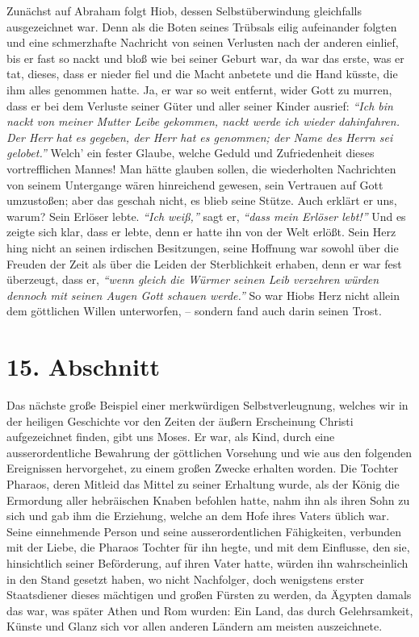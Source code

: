 Zunächst auf Abraham folgt Hiob, dessen
Selbstüberwindung gleichfalls
ausgezeichnet war. Denn als die Boten seines Trübsals eilig aufeinander
folgten und eine schmerzhafte Nachricht von seinen Verlusten nach der anderen
einlief, bis er fast so nackt und bloß wie bei seiner Geburt war, da war das
erste, was er tat, dieses, dass er nieder fiel und die Macht anbetete und die
Hand küsste, die ihm alles genommen hatte. Ja, er war so weit entfernt, wider
Gott zu murren, dass er bei dem Verluste seiner Güter und aller seiner Kinder
ausrief:
\textit{"`Ich bin nackt von meiner Mutter Leibe gekommen, nackt werde ich
wieder dahinfahren. Der Herr hat es gegeben, der Herr hat es genommen; der Name
des Herrn sei gelobet."'}
Welch' ein fester Glaube, welche
Geduld und Zufriedenheit dieses vortrefflichen Mannes! Man hätte glauben sollen,
die wiederholten Nachrichten von seinem Untergange wären hinreichend gewesen,
sein Vertrauen auf Gott umzustoßen; aber das geschah nicht, es blieb seine
Stütze. Auch erklärt er uns, warum? Sein Erlöser lebte.
\textit{"`Ich weiß,"'} sagt er,
\textit{"`dass mein Erlöser lebt!"'}
Und es zeigte sich
klar, dass er lebte, denn er hatte ihn von der Welt erlößt. Sein Herz hing
nicht an seinen irdischen Besitzungen, seine Hoffnung war sowohl über die
Freuden der Zeit als über die Leiden der Sterblichkeit erhaben, denn er war fest
überzeugt, dass er,
\textit{"`wenn gleich die Würmer seinen Leib verzehren würden
dennoch mit seinen Augen Gott schauen werde."'}
So war Hiobs
Herz nicht allein dem göttlichen Willen unterworfen, – sondern fand auch darin
seinen Trost.

\section{15. Abschnitt} \label{kap4_ab15}

Das nächste große Beispiel einer merkwürdigen
Selbstverleugnung, welches wir in
der heiligen Geschichte vor den Zeiten der äußern Erscheinung Christi
aufgezeichnet finden, gibt uns Moses. Er war, als Kind,
durch eine
ausserordentliche Bewahrung der göttlichen Vorsehung und wie aus den folgenden
Ereignissen hervorgehet, zu einem großen Zwecke erhalten worden. Die Tochter
Pharaos,
deren Mitleid das Mittel zu seiner Erhaltung wurde, als der König die
Ermordung aller hebräischen Knaben befohlen hatte, nahm ihn als ihren Sohn zu
sich und gab ihm die Erziehung, welche an dem Hofe ihres Vaters üblich war.
Seine einnehmende Person und seine ausserordentlichen Fähigkeiten, verbunden mit
der Liebe, die Pharaos Tochter für ihn hegte, und mit dem Einflusse, den sie,
hinsichtlich seiner Beförderung, auf ihren Vater hatte, würden ihn
wahrscheinlich in den Stand gesetzt haben, wo nicht Nachfolger, doch wenigstens
erster Staatsdiener dieses mächtigen und großen Fürsten zu werden, da
Ägypten damals das war, was später Athen
 und Rom wurden: Ein Land, das
durch Gelehrsamkeit, Künste und Glanz sich vor allen anderen Ländern am meisten
auszeichnete.

